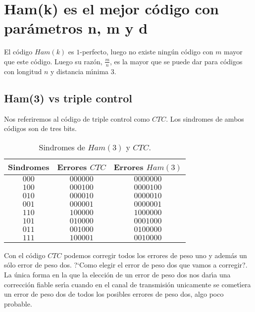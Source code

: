 %
%

\section{Ham(k) es el mejor c\'odigo con par\'ametros n, m y d}

El c\'odigo $Ham(k)$ es $1$-perfecto, luego no existe ning\'un c\'odigo con
$m$ mayor que este c\'odigo. Luego su raz\'on, $\frac{m}{n}$, es la mayor que
se puede dar para c\'odigos con longitud $n$ y distancia m\'{\i}nima $3$.

\subsection{Ham(3) vs triple control}

Nos referiremos al c\'odigo de triple control como $CTC$. Los sindromes
de ambos c\'odigos son de tres bits.\\

\begin{table}[!h]
\begin{center}
\begin{tabular}{|c|c|c|}
\hline
Sindromes& Errores $CTC$& Errores $Ham(3)$ \\
\hline
$000$&$000000$&$0000000$\\
\hline
$100$&$000100$&$0000100$\\
\hline
$010$&$000010$&$0000010$\\
\hline
$001$&$000001$&$0000001$\\
\hline
$110$&$100000$&$1000000$\\
\hline
$101$&$010000$&$0001000$\\
\hline
$011$&$001000$&$0100000$\\
\hline
$111$&$100001$&$0010000$\\
\hline
\end{tabular}
\end{center}
\caption{Sindromes de $Ham(3)$ y $CTC$.}\label{tab:Sindromes}
\end{table}
%
\newpage
%
Con el c\'odigo $CTC$ podemos corregir todos los errores de peso uno y adem\'as
un s\'olo error de peso dos. ?`Como elegir el error de peso dos que vamos a
corregir?. La \'unica forma en la que la elecci\'on de un error de peso dos nos
dar\'{\i}a una correcci\'on fiable ser\'{\i}a cuando en el canal de
transmisi\'on unicamente se comet\'{\i}era un error de peso dos de todos los
posibles errores de peso dos, algo poco probable.\\

